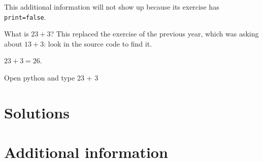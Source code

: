 \documentclass{book}
\begin{document}
\begin{additionalinformation}
This additional information will not show up because its exercise has \texttt{print=false}.
\end{additionalinformation}

\begin{exercise}[examdate={January 16, 2021}, examproblemnumber={1}, examproblemid={2021_01_16_01}, replaces={2020_01_16_01}]
  What is \(23 + 3\)? This replaced the exercise of the previous year, which was asking about \(13 + 3\): look in the source code to find it.
\end{exercise}

\begin{solution}
  \(23 + 3 = 26\).
\end{solution}

\begin{additionalinformation}
Open python and type 23 + 3
\end{additionalinformation}

\chapter{Solutions}

\chapter{Additional information}
\end{document}
